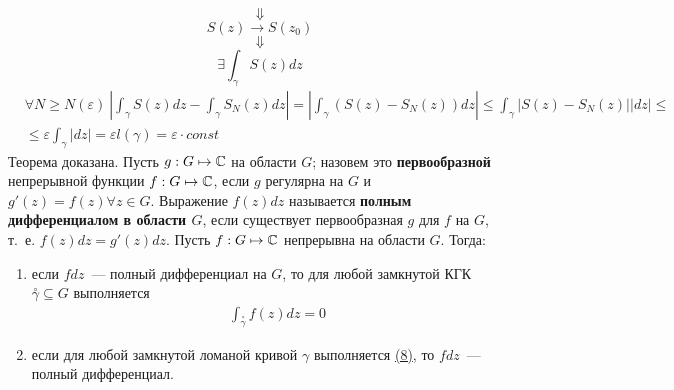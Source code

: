 $$\Downarrow$$
$$S(z) \rightarrow S(z_0)$$
$$\Downarrow$$
$$\exists \int_{\gamma}S(z)dz$$
\begin{align*}
  &\forall N \geq N(\varepsilon) \ \left| \int_{\gamma}S(z)dz - \int_{\gamma}S_N(z)dz\right| = \left| \int_\gamma \left( S(z) - S_N(z) \right)dz\right| \leq \int_\gamma \left| S(z) - S_N(z) \right| \left| dz \right| \leq \\
  & \leq \varepsilon \int_{\gamma} \left| dz \right| = \varepsilon l(\gamma) = \varepsilon \cdot const
\end{align*}
Теорема доказана.
\Def
Пусть $g: G \mapsto \mathbb{C}$ на области $G$; назовем это \textbf{первообразной}
непрерывной функции $f: G \mapsto \mathbb{C}$, если $g$ регулярна на $G$ и $g'(z) =
f(z) \forall z \in G$.
\Def
Выражение $f(z)dz$ называется \textbf{полным дифференциалом в области $G$}, если
существует первообразная $g$ для $f$ на $G$, т.~е. $f(z)dz = g'(z)dz$.
\theorem
Пусть $f:G \mapsto \mathbb{C}$ непрерывна на области $G$. Тогда:
\begin{enumerate}
    \item если $f dz$~--- полный дифференциал на $G$, то для любой замкнутой КГК
    $\overset{\circ}{\gamma} \subseteq G$ \hypertarget{(8)}{выполняется}
    \begin{align}
      & \int_{\overset{\circ}{\gamma}} f(z) dz = 0
    \end{align}
    \item если для любой замкнутой ломаной кривой $\gamma$ выполняется
    \hyperlink{(8)}{(8)}, то $f dz$~--- полный дифференциал.
\end{enumerate}
\pr ~
\\
